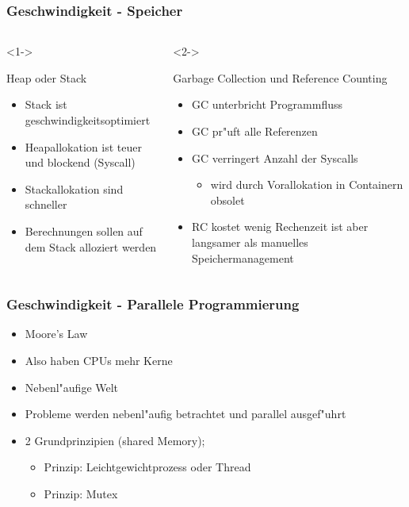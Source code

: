 \documentclass{beamer}
\begin{document}
\begin{frame}
\frametitle{Geschwindigkeit - Speicher }
\begin{columns}
  \begin{column}{0.5\textwidth}<1->
    \begin{block}{Heap oder Stack}
      \begin{itemize}
        \item  Stack ist geschwindigkeitsoptimiert
        \item  Heapallokation ist teuer und blockend (Syscall)
        \item  Stackallokation sind schneller
        \item  Berechnungen sollen auf dem Stack alloziert werden
      \end{itemize}
    \end{block}
  \end{column}
  \begin{column}{0.5\textwidth}<2->
    \begin{block}{Garbage Collection und Reference Counting}
      \begin{itemize}
        \item  GC unterbricht Programmfluss
        \item  GC pr"uft alle Referenzen
        \item  GC verringert Anzahl der Syscalls
        \begin{itemize}
          \item wird durch Vorallokation in Containern obsolet
        \end{itemize}
        \item RC kostet wenig Rechenzeit ist aber langsamer als manuelles Speichermanagement
      \end{itemize}
    \end{block}
  \end{column}
\end{columns}
\; \; \;
\end{frame}


\begin{frame}
\frametitle{Geschwindigkeit - Parallele Programmierung}
\begin{itemize}
  \item <1-> Moore's Law
  \item <2-> Also haben CPUs mehr Kerne
  \item <3-> Nebenl"aufige Welt
  \item <4-> Probleme werden nebenl"aufig betrachtet und parallel ausgef"uhrt
  \item <5-> 2 Grundprinzipien (shared Memory);
  \begin{itemize}
    \item <6-> Prinzip: Leichtgewichtprozess oder Thread
    \item <7-> Prinzip: Mutex
  \end{itemize}
\end{itemize}
\end{frame}
\end{document}
